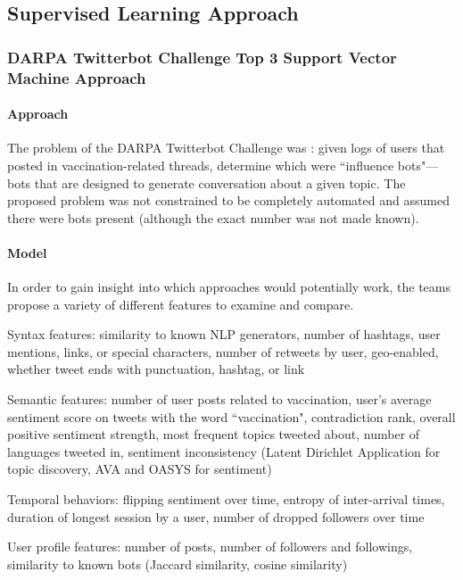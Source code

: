 \documentclass[11pt, oneside]{article}   	%
\begin{document}
\subsection{Supervised Learning Approach}
\subsubsection{DARPA Twitterbot Challenge Top 3 Support Vector Machine Approach}

\paragraph{Approach}
\quad

\quad The problem of the DARPA Twitterbot Challenge was \cite{darpa}: given logs of users that posted in vaccination-related threads, determine which were ``influence bots"---bots that are designed to generate conversation about a given topic.
The proposed problem was not constrained to be completely automated and assumed there were bots present (although the exact number was not made known).

\paragraph{Model}
\quad

\quad In order to gain insight into which approaches would potentially work, the teams propose a variety of different features to examine and compare.

Syntax features: similarity to known NLP generators, number of hashtags, user mentions, links, or special characters, number of retweets by user, geo-enabled, whether tweet ends with punctuation, hashtag, or link

Semantic features: number of user posts related to vaccination, user's average sentiment score on tweets with the word ``vaccination", contradiction rank, overall positive sentiment strength, most frequent topics tweeted about, number of languages tweeted in, sentiment inconsistency (Latent Dirichlet Application for topic discovery, AVA and OASYS for sentiment)

Temporal behaviors: flipping sentiment over time, entropy of inter-arrival times, duration of longest session by a user, number of dropped followers over time

User profile features: number of posts, number of followers and followings, similarity to known bots (Jaccard similarity, cosine similarity)
\end{document}
